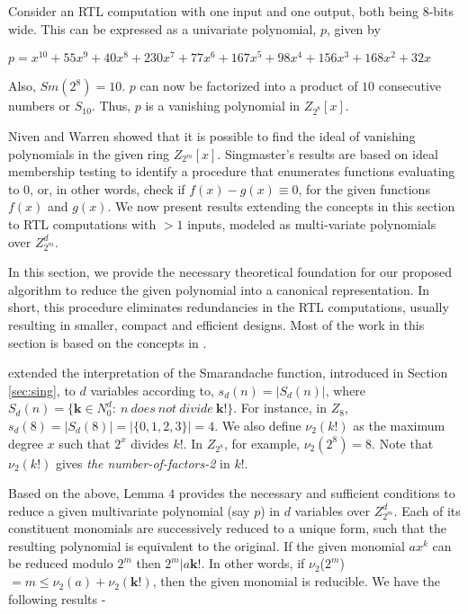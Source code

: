 \begin{example} %
Consider an RTL computation with one input and one output, both being $8$-bits wide. This can be expressed as a univariate polynomial, $p$, given by
\begin{center} 
$p = x^{10} + 55x^9+ 40x^8 + 230x^7 + 77x^6 + 167x^5 + 98x^4 + 156x^3 + 168x^2 + 32x$
\end{center}
Also, $Sm(2^8) = 10$. $p$ can now be factorized into a product of $10$ consecutive numbers or $S_{10}$. Thus, $p$ is a vanishing polynomial in $Z_{2^8}[x]$.
\end{example}

Niven and Warren \cite{niven} showed that it is possible to find the
ideal of vanishing polynomials in the given ring
$Z_{2^m}[x]$. Singmaster's results are based on ideal membership
testing to identify a procedure that enumerates functions evaluating
to $0$, or, in other words, check if $f(x)-g(x) \equiv 0$, for the
given functions $f(x)$ and $g(x)$. We now present results extending
the concepts in this section to RTL computations with $> 1$ inputs,
modeled as multi-variate polynomials over $Z_{2^m}^d$.

In this section, we provide the necessary theoretical foundation for our proposed algorithm to reduce the given polynomial
into a canonical representation. In short, this procedure eliminates redundancies in the RTL computations, usually
resulting in smaller, compact and efficient designs. Most of the work in this section is based on the concepts in
\cite{smarandache_function}.

\cite{smarandache_function} extended the interpretation of the Smarandache function, introduced in Section \ref{sec:sing},
to $d$ variables according to, $s_d(n) = |S_d(n)|$, where $S_d(n) = \{\textbf{k} \in N^d_0:~n ~does ~not ~divide
~\textbf{k!}\}$. For instance, in $Z_8$, $s_d(8) = |S_d(8)| = |\{0,1,2,3\}| = 4$.
We also define $\nu_2(k!)$ as the maximum degree $x$ such that $2^x$ divides $k!$. In $Z_{2^8}$, for example, $\nu_2(2^8) =
8$. Note that $\nu_2(k!)$ gives \textit{the number-of-factors-2} in $k!$.

Based on the above, Lemma $4$ \cite{smarandache_function} provides the necessary and sufficient conditions to reduce a given
multivariate polynomial (say $p$) in $d$ variables over $Z_{2^m}^d$. Each of its constituent monomials are successively
reduced to a unique form, such that the resulting polynomial is equivalent to the original. If the given monomial
$a$\textbf{$x^{k}$} can be reduced modulo $2^m$ then $2^m|a\textbf{k!}$. In other words, if $\nu_2$(\textbf{$2^m$}) $= m
\leq \nu_2(a) +
\nu_2(\textbf{k!})$, then the given monomial is reducible. We have the following results -

